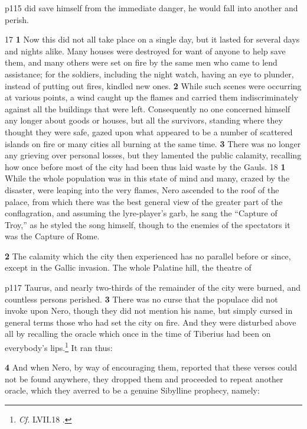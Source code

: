 p115 did save himself from the immediate danger, he would fall into another and perish.

17
\textbf{1} Now this did not all take place on a single day, but it lasted for several days and nights alike. Many houses were destroyed for want of anyone to help save them, and many others were set on fire by the same men who came to lend assistance; for the soldiers, including the night watch, having an eye to plunder, instead of putting out fires, kindled new ones. \textbf{2} While such scenes were occurring at various points, a wind caught up the flames and carried them indiscriminately against all the buildings that were left. Consequently no one concerned himself any longer about goods or houses, but all the survivors, standing where they thought they were safe, gazed upon what appeared to be a number of scattered islands on fire or many cities all burning at the same time. \textbf{3} There was no longer any grieving over personal losses, but they lamented the public calamity, recalling how once before most of the city had been thus laid waste by the Gauls.
18
\textbf{1} While the whole population was in this state of mind and many, crazed by the disaster, were leaping into the very flames, Nero ascended to the roof of the palace, from which there was the best general view of the greater part of the conflagration, and assuming the lyre-player's garb, he sang the ``Capture of Troy,'' as he styled the song himself, though to the enemies of the spectators it was the Capture of Rome.

\textbf{2} The calamity which the city then experienced has no parallel before or since, except in the Gallic invasion. The whole Palatine hill, the theatre of

p117 Taurus, and nearly two-thirds of the remainder of the city were burned, and countless persons perished. \textbf{3} There was no curse that the populace did not invoke upon Nero, though they did not mention his name, but simply cursed in general terms those who had set the city on fire. And they were disturbed above all by recalling the oracle which once in the time of Tiberius had been on everybody's lips.\texthebrew{⁠}\footnote{\emph{Cf.} LVII.18 .

} It ran thus:

\textbf{4} And when Nero, by way of encouraging them, reported that these verses could not be found anywhere, they dropped them and proceeded to repeat another oracle, which they averred to be a genuine Sibylline prophecy, namely:

